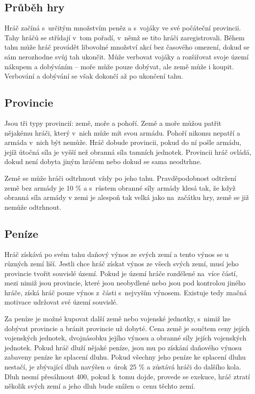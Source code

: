 \documentclass[a4paper,12pt]{article}
\begin{document}
\subsection{Průběh hry}
Hráč začíná s~určitým množstvím peněz a s~vojáky ve své počáteční provincii. Tahy hráčů se střídají v~tom pořadí, v~němž se tito hráči zaregistrovali. Během tahu může hráč provádět libovolné množství akcí bez časového omezení, dokud se sám nerozhodne svůj tah ukončit. Může verbovat vojáky a rozšiřovat svoje území nákupem a dobýváním -- moře může pouze dobývat, ale země může i koupit. Verbování a dobývání se však dokončí až po ukončení tahu.
\subsection{Provincie}
Jsou tři typy provincií: země, moře a pohoří. Země a moře můžou patřit nějakému hráči, který v~nich může mít svou armádu. Pohoří nikomu nepatří a armáda v~nich být nemůže. Hráč dobude provincii, pokud do ní pošle armádu, jejíž útočná síla je vyšší než obranná síla tamních jednotek. Provincii hráč ovládá, dokud není dobyta jiným hráčem nebo dokud se sama neodtrhne.

Země se může hráči odtrhnout vždy po jeho tahu. Pravděpodobnost odtržení země bez armády je 10 \% a s~růstem obranné síly armády klesá tak, že když obranná síla armády v zemi je alespoň tak velká jako na~začátku hry, země se již nemůže odtrhnout.
\subsection{Peníze}
Hráč získává po svém tahu daňový výnos ze svých zemí a tento výnos se u různých zemí liší. Jestli chce hráč získat výnos ze všech svých zemí, musí jeho provincie tvořit souvislé území. Pokud je území hráče rozdělené na~více částí, mezi nimiž jsou provincie, které jsou neobydlené nebo jsou pod kontrolou jiného hráče, získá hráč pouze výnos z~části s~nejvyším výnosem. Existuje tedy značná motivace udržovat své území souvislé.

Za peníze je možné kupovat další země nebo vojenské jednotky, s~nimiž lze dobývat provincie a bránit provincie už dobyté. Cena země je součtem ceny jejích vojenských jednotek, dvojnásobku jejího výnosu a obranné síly jejích vojenských jednotek. Pokud hráč dluží nějaké peníze, jsou mu po získání daňového výnosu zabaveny peníze ke splacení dluhu. Pokud všechny jeho peníze ke splacení dluhu nestačí, je zbývající dluh navýšen o~úrok 25 \% a zůstává hráči do dalšího kola. Dluh nesmí přesáhnout 400, pokud k~tomu dojde, provede se exekuce, hráč ztratí několik svých zemí a jeho dluh bude snížen o~cenu těchto zemí.
\end{document}
